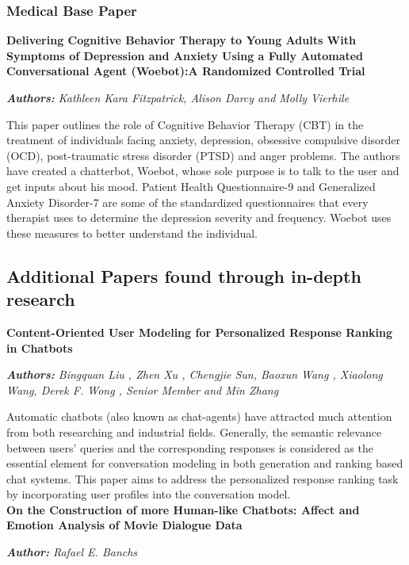 \documentclass[conference,compsoc]{IEEEtran}
\begin{document}
\subsubsection{Medical Base Paper}

\noindent
\textbf{Delivering Cognitive Behavior Therapy to Young Adults With Symptoms of Depression and Anxiety Using a Fully Automated Conversational Agent (Woebot):A Randomized Controlled Trial}

\noindent
\textit{\textbf{Authors:} Kathleen Kara Fitzpatrick, Alison Darcy and Molly Vierhile}

This paper outlines the role of Cognitive Behavior Therapy (CBT) in the treatment of individuals facing anxiety, depression, obsessive compulsive disorder (OCD), post-traumatic stress disorder (PTSD) and anger problems. The authors have created a chatterbot, Woebot, whose sole purpose is to talk to the user and get inputs about his mood. Patient Health Questionnaire-9 and Generalized Anxiety Disorder-7 are some of the standardized questionnaires that every therapist uses to determine the depression severity and frequency. Woebot uses these measures to better understand the individual.

\subsection{Additional Papers found through in-depth research}

\noindent
\textbf{Content-Oriented User Modeling for Personalized Response Ranking in Chatbots}

\noindent
\textit{\textbf{Authors:} Bingquan Liu , Zhen Xu , Chengjie Sun, Baoxun Wang , Xiaolong Wang, Derek F. Wong , Senior Member and Min Zhang}

Automatic chatbots (also known as chat-agents) have attracted much attention from both researching and industrial fields. Generally, the semantic relevance between users’ queries and the corresponding responses is considered as the essential element for conversation modeling in both generation and ranking based chat systems. This paper aims to address the personalized response ranking task by incorporating user profiles into the conversation model.\\

\noindent
\textbf{On the Construction of more Human-like Chatbots: Affect and Emotion Analysis of Movie Dialogue Data}

\noindent
\textit{\textbf{Author:} Rafael E. Banchs}
\end{document}
